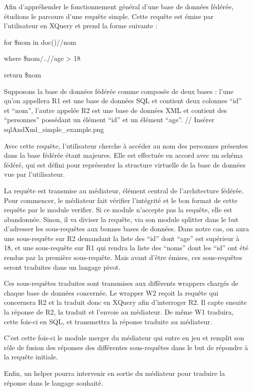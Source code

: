 Afin d’appréhender le fonctionnement général d’une base de données fédérée, étudions le parcours d’une requête simple. Cette requête est émise par l’utilisateur en XQuery et prend la forme suivante :

for \$nom in doc()//nom

where \$nom/..//age > 18

return \$nom

Supposons la base de données fédérée comme composée de deux bases : l’une qu’on appellera R1 est une base de données SQL et contient deux colonnes “id” et “nom”, l’autre appelée R2 est une base de données XML et contient des “personnes” possédant un élément “id” et un élément “age”. // Insérer sqlAndXml_simple_example.png


Avec cette requête, l’utilisateur cherche à accéder au nom des personnes présentes dans la base fédérée étant majeures. Elle est effectuée en accord avec un schéma fédéré, qui est défini pour représenter la structure virtuelle de la base de données vue par l’utilisateur.

La requête est transmise au médiateur, élément central de l’architecture fédérée. Pour commencer, le médiateur fait vérifier l’intégrité et le bon format de cette requête par le module verifier. Si ce module n’accepte pas la requête, elle est abandonnée. Sinon, il va diviser la requête, via son module splitter dans le but d’adresser les sous-requêtes aux bonnes bases de données. Dans notre cas, on aura une sous-requête sur R2 demandant la liste des “id” dont “age” est supérieur à 18, et une sous-requête sur R1 qui rendra la liste des “noms” dont les “id” ont été rendus par la première sous-requête. Mais avant d’être émises, ces sous-requêtes seront traduites dans un langage pivot.

Ces sous-requêtes traduites sont transmises aux différents wrappers chargés de chaque base de données concernée. Le wrapper W2 reçoit la requête qui concernera R2 et la traduit donc en XQuery afin d’interroger R2. Il capte ensuite la réponse de R2, la traduit et l’envoie au médiateur. De même W1 traduira, cette fois-ci en SQL, et transmettra la réponse traduite au médiateur.

C’est cette fois-ci le module merger du médiateur qui entre en jeu et remplit son rôle de fusion des réponses des différentes sous-requêtes dans le but de répondre à la requête initiale.

Enfin, un helper pourra intervenir en sortie du médiateur pour traduire la réponse dans le langage souhaité.

